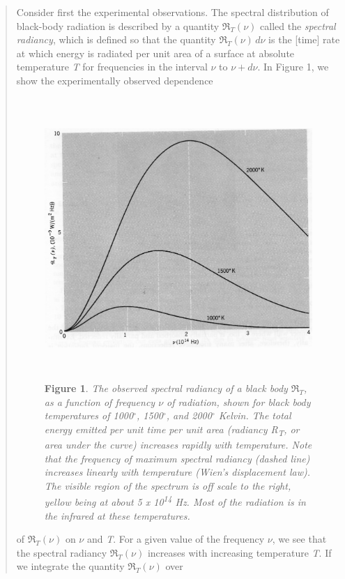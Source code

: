 \begin{quotation}
Consider first the experimental observations. The spectral distribution
of black-body radiation is described by a quantity
$\Re_T(\nu)$ called the \emph{spectral radiancy}, which
is defined so that the quantity $\Re_T(\nu)\,d\nu$ is the
{[}time{]} rate at which energy is radiated per unit area of a surface
at absolute temperature \emph{T} for frequencies in the interval
$\nu$ to $\nu\! +\! d\nu$. In Figure 1, we show the experimentally
observed dependence
%
\begin{figure}[h]
  \centering
  \captionsetup{width=.8\linewidth}
  \includegraphics[width=5.125in,height=4.19792in]{images/05_planck/image001.jpg}
  \caption*{\textbf{Figure 1}. \emph{The observed spectral radiancy of a black body
  $\Re_T$, as a function of frequency $\nu$ of
  radiation, shown for black body temperatures of 1000$^\circ$, 1500$^\circ$, and 2000$^\circ$
  Kelvin. The total energy emitted per unit time per unit area (radiancy
  \emph{R\textsubscript{T}}, or area under the curve) increases rapidly
  with temperature. Note that the frequency of maximum spectral radiancy
  (dashed line) increases linearly with temperature (Wien's displacement
  law). The visible region of the spectrum is off scale to the right,
  yellow being at about 5 x 10\textsuperscript{14} Hz. Most of the
  radiation is in the infrared at these temperatures.}}
\end{figure}
%
of $\Re_T(\nu)$ on $\nu$ and \emph{T}. For a given
value of the frequency $\nu$, we see that the spectral radiancy
$\Re_T(\nu)$ increases with increasing temperature
\emph{T}. If we integrate the quantity $\Re_T(\nu)$ over

\end{quotation}
